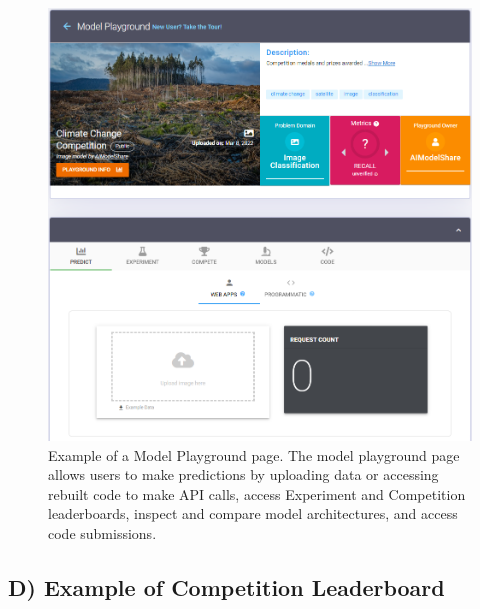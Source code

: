 \begin{figure}[h!]
  \centering
  \includegraphics[width=1\textwidth]{figures/playground.png}
  \caption{Example of a Model Playground page. The model playground page allows users to make predictions by uploading data or accessing rebuilt code to make API calls, access Experiment and Competition leaderboards, inspect and compare model architectures, and access code submissions.}
\end{figure}

\newpage
\subsection{D) Example of Competition Leaderboard}
\label{app:competition}

